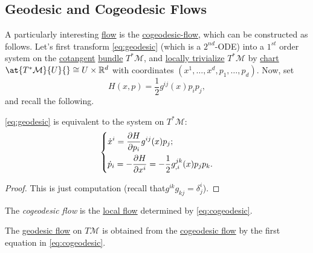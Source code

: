 \subsection{Geodesic and Cogeodesic Flows}
A particularly interesting \hyperref[def:local-flow]{flow} is the \hyperref[def:cogeodesic-flow]{cogeodesic-flow}, which can be constructed as follows. Let's first transform \autoref{eq:geodesic} (which is a \(2^{nd}\)-ODE) into a \(1^{st} \) order system on the \hyperref[def:cotangent-space]{cotangent} \hyperref[def:vector-bundle]{bundle} \(T^{\ast} \mathcal{M} \), and \hyperref[def:local-trivialization]{locally trivialize} \(T^{\ast} \mathcal{M} \) by \hyperref[def:coordinate-chart]{chart} \(\at{T^{\ast} \mathcal{M} }{U}{} \cong U \times \mathbb{R} ^d\) with coordinates \((x^1, \ldots , x^d, p_1, \ldots , p_d)\). Now, set
\begin{equation}\label{eq:Hamilton}
	H(x, p) = \frac{1}{2} g^{ij} (x) p_i p_j,
\end{equation}
and recall the following.

\begin{theorem}
	\autoref{eq:geodesic} is equivalent to the system on \(T^{\ast} \mathcal{M} \):
	\begin{equation}\label{eq:cogeodesic}
		\begin{dcases}
			\dot{x}^i = \frac{\partial H}{\partial p_i} g^{ij}(x) p_j; \\
			\dot{p}_i = -\frac{\partial H}{\partial x^i} = -\frac{1}{2} g^{jk}_{, i}(x)p_j p_k.
		\end{dcases}
	\end{equation}
\end{theorem}
\begin{proof}
	This is just computation (recall that\(g^{ik} g_{kj} = \delta ^i_j \)).
\end{proof}

\begin{definition}\label{def:cogeodesic-flow}
	The \emph{cogeodesic flow} is the \hyperref[def:local-flow]{local flow} determined by \autoref{eq:cogeodesic}.
\end{definition}

\begin{definition}\label{def:geodesic-flow}
	The \hyperref[def:geodesic-flow]{geodesic flow} on \(T\mathcal{M} \) is obtained from the \hyperref[def:cogeodesic-flow]{cogeodesic flow} by the first equation in \autoref{eq:cogeodesic}.
\end{definition}

